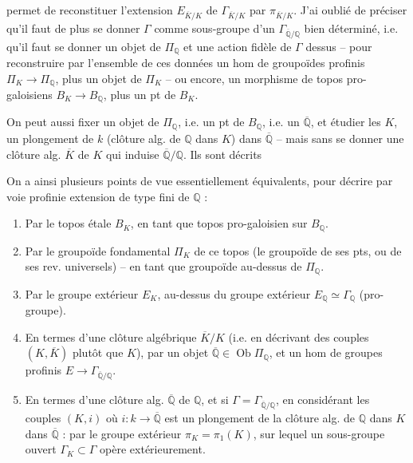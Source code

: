\documentclass[11pt,a4paper]{article}
\begin{document}
permet de reconstituer l'extension $E_{\overline{K}/K}$ de $\Gamma_{\overline{K}/K}$ par $\pi_{\overline{K}/K}$. J'ai oublié de préciser qu'il faut de plus se donner $\Gamma$ comme sous-groupe d'un $\Gamma_{\overline{\mathbb{Q}}/\mathbb{Q}}$ bien déterminé, i.e. qu'il faut se donner un objet de $\Pi_{\mathbb{Q}}$ et une action fidèle de $\Gamma$ dessus -- pour reconstruire par l'ensemble de ces données un hom de groupoïdes profinis $\Pi_K \to \Pi_{\mathbb{Q}}$, plus un objet de $\Pi_K$ -- ou encore, un morphisme de topos pro-galoisiens $B_K \to B_{\mathbb{Q}}$, plus un pt de $B_K$.

On peut aussi fixer un objet de $\Pi_{\mathbb{Q}}$, i.e. un pt de $B_{\mathbb{Q}}$, i.e. un $\overline{\mathbb{Q}}$, et étudier les $K$,   un plongement de $k$ (clôture alg. de $\mathbb{Q}$ dans $K$) dans $\overline{\mathbb{Q}}$ --  mais sans se donner une clôture alg. $\overline{K}$ de $K$ qui induise $\overline{\mathbb{Q}}/\mathbb{Q}$. Ils sont décrits

On a ainsi plusieurs points de vue essentiellement équivalents, pour décrire par voie profinie   extension de type fini de $\mathbb{Q}$ :
\begin{enumerate}
  \item Par le topos étale $B_K$, en tant que topos pro-galoisien sur $B_{\mathbb{Q}}$.
  \item Par le groupoïde fondamental $\Pi_K$ de ce topos (le groupoïde de ses pts, ou de ses rev. universels) -- en tant que groupoïde au-dessus de $\Pi_{\mathbb{Q}}$.
  \item Par le groupe extérieur $E_K$, au-dessus du groupe extérieur $E_{\mathbb{Q}} \simeq \Gamma_{\mathbb{Q}}$ (pro-groupe).
  \item En termes d'une clôture algébrique $\overline{K}/K$ (i.e. en décrivant des couples $(K, \overline{K})$ plutôt que $K$), par un objet $\overline{\mathbb{Q}} \in \operatorname{Ob} \Pi_{\mathbb{Q}}$, et un hom de groupes profinis $E \to \Gamma_{\overline{\mathbb{Q}}/\mathbb{Q}}$. 
  \item En termes d'une clôture alg.  $\overline{\mathbb{Q}}$ de $\mathbb{Q}$, et si $\Gamma = \Gamma_{\overline{\mathbb{Q}}/\mathbb{Q}}$,  en considérant les couples $(K, i)$ où $i : k \to \overline{\mathbb{Q}}$ est un plongement de la clôture alg.  de $\mathbb{Q}$ dans $K$ dans $\overline{\mathbb{Q}}$ : \struck{\ill{}} par le groupe extérieur $\pi_K = \pi_1(K)$, sur lequel un sous-groupe ouvert $\Gamma_K \subset \Gamma$ opère extérieurement.
\end{enumerate}
\end{document}
